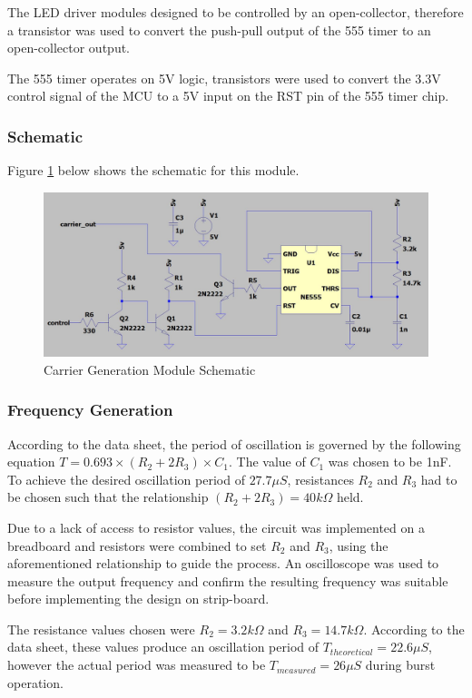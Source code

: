 The LED driver modules designed to be controlled by an open-collector, therefore a transistor was used to convert the push-pull output of the 555 timer to an open-collector output.

The 555 timer operates on 5V logic, transistors were used to convert the 3.3V control signal of the MCU to a 5V input on the RST pin of the 555 timer chip.

\subsubsection{Schematic}
Figure \ref{fig:schematic_carrier_generation} below shows the schematic for this module.

\begin{figure}[H]
	\centering
	\includegraphics[width=.8\textwidth]{figures/design/carrier_waveform_generator_555.JPG}
	\caption{Carrier Generation Module Schematic}
	\label{fig:schematic_carrier_generation}
\end{figure}

\subsubsection{Frequency Generation}

According to the data sheet, the period of oscillation is governed by the following equation \(T = 0.693\times (R_2 + 2R_3)\times C_1\). The value of $C_1$ was chosen to be 1nF. To achieve the desired oscillation period of $27.7\mu S$, resistances $R_2$ and $R_3$ had to be chosen such that the relationship $(R_2 + 2R_3) = 40k\Omega$ held.

Due to a lack of access to resistor values, the circuit was implemented on a breadboard and resistors were combined to set $R_2$ and $R_3$, using the aforementioned relationship to guide the process. An oscilloscope was used to measure the output frequency and confirm the resulting frequency was suitable before implementing the design on strip-board.

The resistance values chosen were $R_2 = 3.2k\Omega$ and $R_3 = 14.7k\Omega$. According to the data sheet, these values produce an oscillation period of \(T_{theoretical} = 22.6\mu S\), however the actual period was measured to be \(T_{measured} = 26\mu S\) during burst operation.

